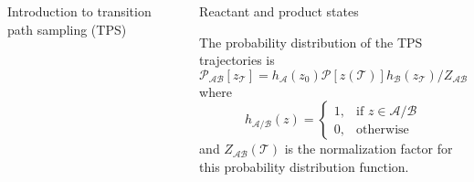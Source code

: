 \documentclass[final]{beamer}
\newlength{\sepwidth}
\newlength{\colwidth}
\newcommand{\separatorcolumn}{\begin{column}{\sepwidth}\end{column}}
\begin{document}
\begin{frame}[t]
\begin{columns}[t]
\begin{column}{\colwidth}
\begin{block}{Introduction to transition path sampling (TPS)}
  \end{block}

\end{column}

\separatorcolumn

\begin{column}{\colwidth}

  \begin{block}{Reactant and product states}
  \begin{figure}%
\centering
{}%
\quad
{}
\label{fig:tps-states}%
\end{figure}
   The probability distribution of the TPS trajectories is
   \begin{equation}
\mathcal{P}_{\mathcal{AB}}[z_{\mathcal{T}}] = h_{\mathcal{A}}(z_0)\mathcal{P}[z(\mathcal{T})]
h_{\mathcal{B}}(z_{\mathcal{T}})/Z_{\mathcal{AB}}(\mathcal{T})\label{eqn:tpsensem} \nonumber 
\end{equation}
where 
\[
    h_{\mathcal{A}/\mathcal{B}}(z)= 
\begin{cases}
    1, & \text{if } z\in \mathcal{A}/\mathcal{B}\\
    0,              & \text{otherwise}
\end{cases}
\]
and $Z_{\mathcal{AB}}(\mathcal{T})$ is the normalization factor for this 
probability distribution function.
  \end{block}


\end{column}
\end{columns}
\end{frame}
\end{document}
